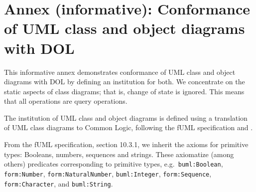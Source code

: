 \documentclass[10pt,fleqn,%
\ifpretendfinal
final%
\else
draft%
\fi,
]{scrreprt}
\newcommand{\infannex}[1]{ \chapter{Annex (informative): #1} }
\begin{document}
\infannex{Conformance of UML class and object diagrams with DOL}\label{a:uml-class}

This informative annex demonstrates conformance of UML class and
object diagrams with DOL by defining an institution for both. We
concentrate on the static aspects of class diagrams; that is, change
of state is ignored. This means that all operations are query
operations.

The institution of UML class and object diagrams is defined using a
translation of UML class diagrams to Common Logic, following the fUML
specification and \cite{Seidewitz08}.

From the fUML specification, section 10.3.1, we inherit the axioms for
primitive types: Booleans, numbers, sequences and strings.  These
axiomatize (among others) predicates corresponding to primitive types,
e.g.\ \texttt{buml:Boolean}, \texttt{form:Number},
\texttt{form:NaturalNumber}, \texttt{buml:Integer},
\texttt{form:Sequence}, \texttt{form:Character}, and
\texttt{buml:String}.
\end{document}
